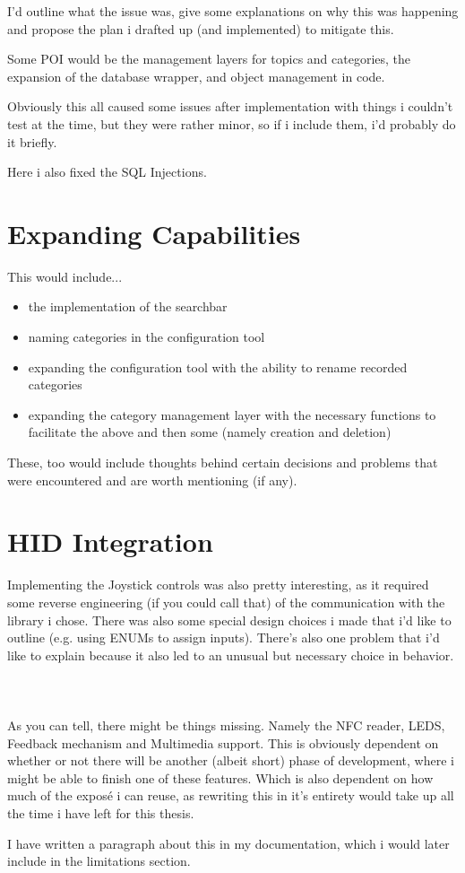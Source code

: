 I'd outline what the issue was, give some explanations on why this was happening and propose the plan i drafted up (and implemented) to mitigate this.

Some POI would be the management layers for topics and categories, the expansion of the database wrapper, and object management in code.

Obviously this all caused some issues after implementation with things i couldn't test at the time, but they were rather minor, so if i include them, i'd probably do it briefly.

Here i also fixed the SQL Injections.

\section{Expanding Capabilities}

This would include...

\begin{itemize}
	\item the implementation of the searchbar
	\item naming categories in the configuration tool
	\item expanding the configuration tool with the ability to rename recorded categories
	\item expanding the category management layer with the necessary functions to facilitate the above and then some (namely creation and deletion)
\end{itemize}

These, too would include thoughts behind certain decisions and problems that were encountered and are worth mentioning (if any).

\section{HID Integration}

Implementing the Joystick controls was also pretty interesting, as it required some reverse engineering (if you could call that) of the communication with the library i chose.
There was also some special design choices i made that i'd like to outline (e.g. using ENUMs to assign inputs).
There's also one problem that i'd like to explain because it also led to an unusual but necessary choice in behavior.\\\\\\\\


As you can tell, there might be things missing. Namely the NFC reader, LEDS, Feedback mechanism and Multimedia support.
This is obviously dependent on whether or not there will be another (albeit short) phase of development, where i might be able to finish one of these features. Which is also dependent on how much of the exposé i can reuse, as rewriting this in it's entirety would take up all the time i have left for this thesis.

I have written a paragraph about this in my documentation, which i would later include in the limitations section.